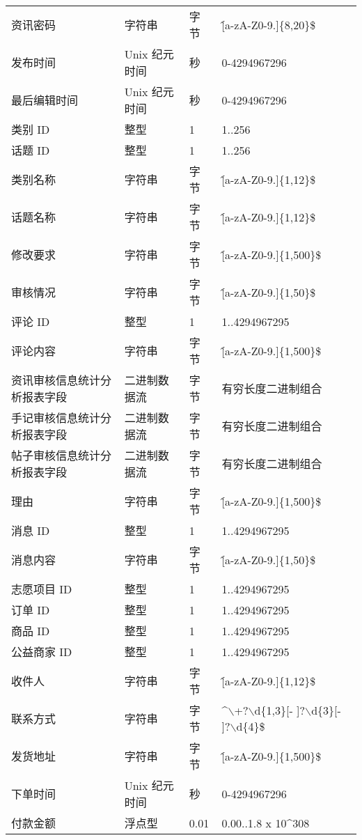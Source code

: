 \begin{longtable}{p{3.5cm}llp{4cm}}
        资讯密码 & 字符串 & 字节 & \^[a-zA-Z0-9.]\{8,20\}\$ \\ 
        发布时间 & Unix 纪元时间 & 秒 & 0-4294967296 \\ 
        最后编辑时间 & Unix 纪元时间 & 秒 & 0-4294967296 \\ 
        类别 ID & 整型  & 1 & 1..256 \\ 
        话题 ID & 整型  & 1 & 1..256 \\ 
        类别名称 & 字符串 & 字节 & \^[a-zA-Z0-9.]\{1,12\}\$ \\ 
        话题名称 & 字符串 & 字节 & \^[a-zA-Z0-9.]\{1,12\}\$ \\ 
        修改要求 & 字符串 & 字节 & \^[a-zA-Z0-9.]\{1,500\}\$ \\
        审核情况 & 字符串 & 字节 & \^[a-zA-Z0-9.]\{1,50\}\$ \\ 
        评论 ID & 整型  & 1 & 1..4294967295 \\ 
        评论内容 & 字符串 & 字节 & \^[a-zA-Z0-9.]\{1,500\}\$ \\ 
        资讯审核信息统计分析报表字段 & 二进制数据流 & 字节 & 有穷长度二进制组合 \\
        手记审核信息统计分析报表字段 & 二进制数据流 & 字节 & 有穷长度二进制组合 \\ 
        帖子审核信息统计分析报表字段 & 二进制数据流 & 字节 & 有穷长度二进制组合 \\ 
        理由 & 字符串 & 字节 & \^[a-zA-Z0-9.]\{1,500\}\$ \\ 
        消息 ID & 整型  & 1 & 1..4294967295 \\ 
        消息内容 & 字符串 & 字节 & \^[a-zA-Z0-9.]\{1,50\}\$ \\ 
        志愿项目 ID & 整型  & 1 & 1..4294967295 \\
        订单 ID & 整型  & 1 & 1..4294967295 \\ 
        商品 ID & 整型  & 1 & 1..4294967295 \\ 
        公益商家 ID & 整型  & 1 & 1..4294967295 \\ 
        收件人 & 字符串 & 字节 & \^[a-zA-Z0-9.]\{1,12\}\$ \\ 
        联系方式 & 字符串 & 字节 & \^$\backslash$+?$\backslash$d\{1,3\}[- ]?$\backslash$d\{3\}[- ]?$\backslash$d\{4\}\$ \\
        发货地址 & 字符串 & 字节 & \^[a-zA-Z0-9.]\{1,500\}\$ \\
        下单时间 & Unix 纪元时间 & 秒 & 0-4294967296 \\ 
        付款金额 & 浮点型  & 0.01 & 0.00..1.8 x 10^308 \\ 

\end{longtable}
